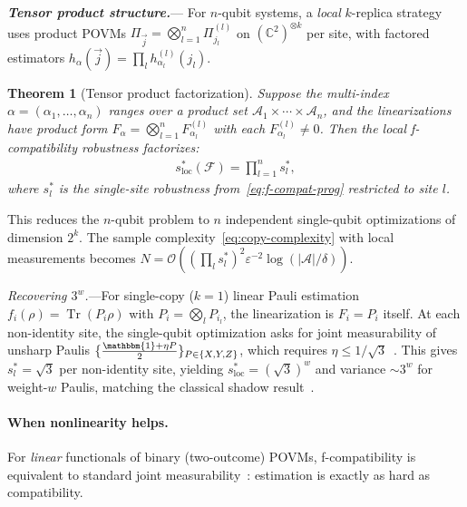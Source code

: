 \documentclass[aps,%
twocolumn,%
floatfix,%
pra,%
amsfonts,%
groupedaddress,%
superscriptaddress]{revtex4-2}%
\newtheorem{theorem}{Theorem}
\DeclareMathOperator{\tr}{Tr}
\newcommand{\ox}{\otimes}
\newcommand{\1}{\mathbbm{1}}
\newcommand*{\cF}{\mathcal{F}}
\newcommand*{\cA}{\mathcal{A}}
\newcommand\prlsection[1]{\textit{\textbf{#1}}---}
\newcommand\prlsubsection[1]{\paragraph*{#1\!\!\!\!}}
\begin{document}
\prlsection{Tensor product structure.}\label{sec:tensor}
For $n$-qubit systems, a \emph{local} $k$-replica strategy uses product POVMs $\Pi_{\vec{j}} = \bigotimes_{l=1}^n \Pi_{j_l}^{(l)}$ on $(\mathbb{C}^2)^{\ox k}$ per site, with factored estimators $h_\alpha(\vec{j}) = \prod_l h_{\alpha_l}^{(l)}(j_l)$.

\begin{theorem}[Tensor product factorization]\label{thm:tensor}
Suppose the multi-index $\alpha = (\alpha_1,\ldots,\alpha_n)$ ranges over a product set $\cA_1\times\cdots\times\cA_n$, and the linearizations have product form $F_\alpha = \bigotimes_{l=1}^n F_{\alpha_l}^{(l)}$ with each $F_{\alpha_l}^{(l)} \neq 0$. Then the local f-compatibility robustness factorizes:
\begin{align}\label{eq:tensor-factor}
s^*_{\mathrm{loc}}(\cF) = \prod_{l=1}^n s^*_l,
\end{align}
where $s^*_l$ is the single-site robustness from~\eqref{eq:f-compat-prog} restricted to site $l$.
\end{theorem}

This reduces the $n$-qubit problem to $n$ independent single-qubit optimizations of dimension $2^k$. The sample complexity~\eqref{eq:copy-complexity} with local measurements becomes $N = \mathcal{O}\!\left((\prod_l s^*_l)^2\varepsilon^{-2}\log(|\cA|/\delta)\right)$.

\emph{Recovering $3^w$.}---For single-copy ($k=1$) linear Pauli estimation $f_i(\rho) = \tr(P_i\rho)$ with $P_i = \bigotimes_l P_{i_l}$, the linearization is $F_i = P_i$ itself. At each non-identity site, the single-qubit optimization asks for joint measurability of unsharp Paulis $\{\frac{\1 + \eta P}{2}\}_{P\in\{X,Y,Z\}}$, which requires $\eta \leq 1/\sqrt{3}$~\cite{Busch1986,heinosaari2015noise}. This gives $s^*_l = \sqrt{3}$ per non-identity site, yielding $s^*_{\mathrm{loc}} = (\sqrt{3})^w$ and variance $\sim 3^w$ for weight-$w$ Paulis, matching the classical shadow result~\cite{huang2020predicting}.

\prlsubsection{When nonlinearity helps.}\label{sec:nonlinear}
For \emph{linear} functionals of binary (two-outcome) POVMs, f-compatibility is equivalent to standard joint measurability~\cite{designolle2019incompatibility}: estimation is exactly as hard as compatibility.
\end{document}
